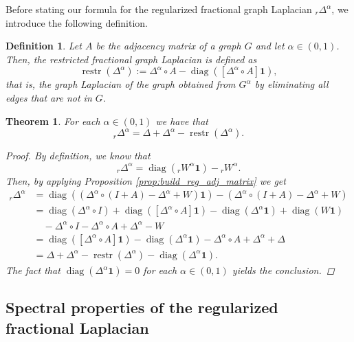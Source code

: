 \documentclass[a4paper,12pt]{article}
\newtheorem{theorem}{Theorem}
\newtheorem{definition}{Definition}
\DeclareMathOperator{\diag}{diag}
\DeclareMathOperator{\restr}{restr}
\newcommand{\onevec}{\mathbf{1}}
\newcommand{\fL}{\Delta^\alpha}
\newcommand{\rfL}{{}_r\fL}
\newcommand{\fW}{W^\alpha}
\newcommand{\rfW}{{}_r\fW}
\newcommand{\fG}{G^\alpha}
\begin{document}
Before stating our formula for the regularized fractional graph Laplacian $\rfL$, we introduce the following definition.

\begin{definition} \label{def:restr_f_laplacian}
    Let $A$ be the adjacency matrix of a graph $G$ and let $\alpha\in(0,1)$. Then, the \emph{restricted fractional graph Laplacian} is defined as 
    \begin{equation}\label{eq:restr__fractional_laplacian}
     \restr(\fL):= \fL \circ A - \diag(\left[\fL \circ A\right] \mathbf{1}),  
    \end{equation}
    that is, the graph Laplacian of the graph obtained from $\fG$ by eliminating all edges that are not in $G$. 
\end{definition} 

\begin{theorem}\label{thm:reg_frac_lap}
For each $\alpha\in(0,1)$ we have that 
\begin{equation} \label{eq:reg_laplacian_formula}
        \rfL = \Delta + \Delta^{\alpha} - \restr(\fL).
    \end{equation}
    \begin{proof}
 By definition, we know that
     \begin{equation*} 
         \rfL = \diag(\rfW\mathbf{1})-\rfW.
     \end{equation*}
     Then, by applying Proposition \ref{prop:build_reg_adj_matrix} we get
    \begin{align*}
     \rfL & = \diag((\fL \circ (I+A) - \fL +W)\onevec)-(\fL \circ (I+A) - \fL +W)\\
     &=  \diag(\fL \circ I) + \diag(\left[\fL \circ A\right] \mathbf{1})   - \diag(\fL\mathbf{1}) + \diag(W\onevec) \\
     & \quad - \fL\circ I - \fL \circ A + \fL -W  \\
     &= \diag(\left[\fL \circ A\right] \mathbf{1}) - \diag(\fL\mathbf{1}) - \fL \circ A  + \fL + \Delta \\
     &= \Delta  + \fL - \restr(\fL)   - \diag(\fL\mathbf{1}).  
    \end{align*}
    The fact that $\diag(\fL\mathbf{1})=0$ for each $\alpha\in(0,1)$ yields the conclusion.
    \end{proof}
\end{theorem} 

\subsection{Spectral properties of the regularized fractional Laplacian}\label{subsec:spectral_properties_regularized}
\end{document}
